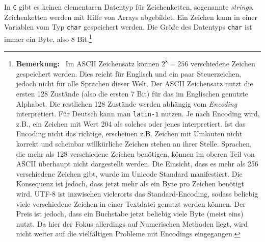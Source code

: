 In \texttt{C} gibt es keinen elementaren Datentyp für Zeichenketten, sogenannte \emph{strings}.
Zeichenketten werden mit Hilfe von Arrays abgebildet.
Ein Zeichen kann in einer Variablen vom Typ \verb|char| gespeichert werden.
Die Größe des Datentyps \texttt{char} ist immer ein Byte, also 8 Bit.\footnote{\textbf{Bemerkung:}~ Im ASCII Zeichensatz können $2^8= 256$ verschiedene Zeichen gespeichert werden.
Dies reicht für Englisch und ein paar Steuerzeichen, jedoch nicht für alle Sprachen dieser Welt.
Der ASCII Zeichensatz nutzt die ersten 128 Zustände (also die ersten 7 Bit) für das im Englischen genutzte Alphabet.
Die restlichen 128 Zustände werden abhängig vom  \emph{Encoding} interpretiert.
Für Deutsch kann man \texttt{latin-1} nutzen.
Je nach Encoding wird, z.B., ein Zeichen mit Wert 204 als solches oder jenes interpretiert.
Ist das Encoding nicht das richtige, erscheinen z.B. Zeichen mit Umlauten
nicht korrekt und scheinbar willkürliche Zeichen stehen an ihrer Stelle.
Sprachen, die mehr als 128 verschiedene Zeichen benötigen, können im oberen
Teil von ASCII überhaupt nicht dargestellt werden. Die Einsicht, dass es
mehr als 256 verschiedene Zeichen gibt, wurde im Unicode Standard
manifestiert. Die Konsequenz ist jedoch, dass jetzt mehr als ein Byte pro
Zeichen benötigt wird. UTF-8 ist inzwischen vielerorts das Standard-Encoding, sodass
beliebig viele verschiedene Zeichen in einer Textdatei genutzt werden
können. Der Preis ist jedoch, dass ein Buchstabe jetzt beliebig viele Byte
(meist eins) nutzt. Da hier der Fokus allerdings auf Numerischen Methoden
liegt, wird nicht weiter auf die vielfältigen Probleme mit Encodings
eingegangen.}

